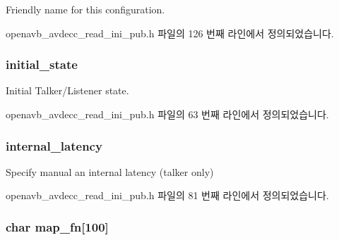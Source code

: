 Friendly name for this configuration. 



openavb\+\_\+avdecc\+\_\+read\+\_\+ini\+\_\+pub.\+h 파일의 126 번째 라인에서 정의되었습니다.

\subsubsection[{\texorpdfstring{initial\+\_\+state}{initial_state}}]{ initial\+\_\+state}\hypertarget{structopenavb__tl__data__cfg_af00cb7d534b8d163f482aacb7bf9661d}{}\label{structopenavb__tl__data__cfg_af00cb7d534b8d163f482aacb7bf9661d}


Initial Talker/\+Listener state. 



openavb\+\_\+avdecc\+\_\+read\+\_\+ini\+\_\+pub.\+h 파일의 63 번째 라인에서 정의되었습니다.

\subsubsection[{\texorpdfstring{internal\+\_\+latency}{internal_latency}}]{ internal\+\_\+latency}\hypertarget{structopenavb__tl__data__cfg_a770b9a7e3ef496ca3269c2005f12fa81}{}\label{structopenavb__tl__data__cfg_a770b9a7e3ef496ca3269c2005f12fa81}


Specify manual an internal latency (talker only) 



openavb\+\_\+avdecc\+\_\+read\+\_\+ini\+\_\+pub.\+h 파일의 81 번째 라인에서 정의되었습니다.

\subsubsection[{\texorpdfstring{map\+\_\+fn}{map_fn}}]{\setlength{\rightskip}{0pt plus 5cm}char map\+\_\+fn\mbox{[}100\mbox{]}}\hypertarget{structopenavb__tl__data__cfg_a2db51089f2117ba4aece1285e47c220f}{}\label{structopenavb__tl__data__cfg_a2db51089f2117ba4aece1285e47c220f}


